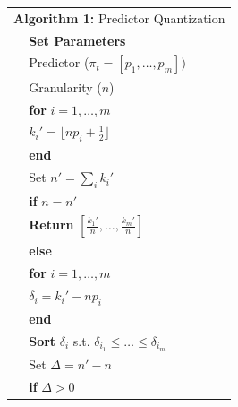 \documentclass{article}
\begin{document}
\newcommand\showline{\stepcounter{linenum}\thelinenum}

\begin{tabularx}{0.9\linewidth}{|l X|} %
    \bottomrule
    \multicolumn{2}{|l|}{\textbf{Algorithm 1:} Predictor Quantization}                                 \\
    \showline & \textbf{Set Parameters}                                                                \\
    \showline & \quad Predictor (\( \pi_t = [p_1, \ldots, p_m]) \)                                     \\
    \showline & \quad Granularity (\( n \))                                                            \\
    \showline & \textbf{for} \( i = 1, \ldots, m \)                                                    \\
    \showline & \quad \( k_i' = \lfloor np_i + \frac{1}{2} \rfloor \)                                  \\
    \showline & \textbf{end}                                                                           \\
    \showline & Set \( n' = \sum_i k_i' \)                                                             \\
    \showline & \textbf{if} \( n=n' \)                                                                 \\
    \showline & \quad \textbf{Return} \([\frac{k_1'}{n}, \ldots, \frac{k_m'}{n}] \)                    \\
    \showline & \textbf{else}                                                                          \\
    \showline & \quad \textbf{for} \( i=1,\ldots,m \)                                                  \\
    \showline & \quad\quad \( \delta_i = k_i' - np_i\)                                                 \\
    \showline & \quad \textbf{end}                                                                     \\
    \showline & \quad \textbf{Sort} \( \delta_i \) s.t. \( \delta_{i_1} \le \ldots \le \delta_{i_m} \) \\
    \showline & \quad Set \( \Delta = n'-n \)                                                          \\
    \showline & \quad \textbf{if} \( \Delta > 0 \)                                                     \\

\end{tabularx}
\end{document}
